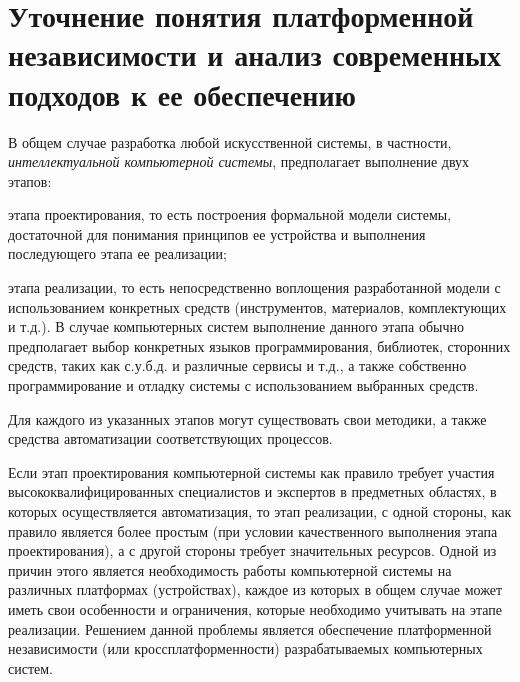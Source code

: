\section{Уточнение понятия платформенной независимости и анализ современных подходов к ее обеспечению}
\label{sec_interpreter_analysis}

В общем случае разработка любой искусственной системы, в частности, \textit{интеллектуальной компьютерной системы}, предполагает выполнение двух этапов:
\begin{textitemize}
	\item этапа проектирования, то есть построения формальной модели системы, достаточной для понимания принципов ее устройства и выполнения последующего этапа ее реализации;
	\item этапа реализации, то есть непосредственно воплощения разработанной модели с использованием конкретных средств (инструментов, материалов, комплектующих и т.д.). В случае компьютерных систем выполнение данного этапа обычно предполагает выбор конкретных языков программирования, библиотек, сторонних средств, таких как с.у.б.д. и различные сервисы и т.д., а также собственно программирование и отладку системы с использованием выбранных средств.
\end{textitemize}

Для каждого из указанных этапов могут существовать свои методики, а также средства автоматизации соответствующих процессов.

Если этап проектирования компьютерной системы как правило требует участия высококвалифицированных специалистов и экспертов в предметных областях, в которых осуществляется автоматизация, то этап реализации, с одной стороны, как правило является более простым (при условии качественного выполнения этапа проектирования), а с другой стороны требует значительных ресурсов. Одной из причин этого является необходимость работы компьютерной системы на различных платформах (устройствах), каждое из которых в общем случае может иметь свои особенности и ограничения, которые необходимо учитывать на этапе реализации. Решением данной проблемы является обеспечение платформенной независимости (или кроссплатформенности) разрабатываемых компьютерных систем.

